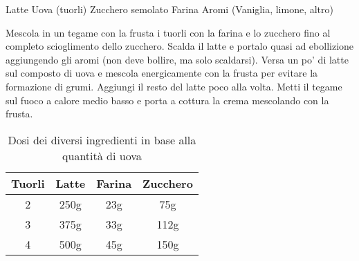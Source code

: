 \label{crema-pasticcera}
\begin{ingreds}
	Latte
	Uova (tuorli)
	Zucchero semolato
	Farina
	Aromi (Vaniglia, limone, altro)
\end{ingreds}
\begin{method}

	Mescola in un tegame con la frusta i tuorli con la farina e lo zucchero fino al completo scioglimento dello zucchero. Scalda il latte e portalo quasi ad ebollizione aggiungendo gli aromi (non deve bollire, ma solo scaldarsi). Versa un po' di latte sul composto di uova e mescola energicamente con la frusta per evitare la formazione di grumi. Aggiungi il resto del latte poco alla volta. Metti il tegame sul fuoco a calore medio basso e porta a cottura la crema mescolando con la frusta.

\begin{table}[h]
	\begin{center}
\begin{tabular}{cccc}
\toprule
	Tuorli	&	Latte	&	Farina	&	Zucchero \\
\midrule
	2	&	250g	&	23g	&	75g \\
	3	&	375g	&	33g	&	112g	\\
	4	&	500g	&	45g	&	150g	\\
\bottomrule
\end{tabular}
	\caption{Dosi dei diversi ingredienti in base alla quantità di uova}
	\end{center}
\end{table}


\end{method}



